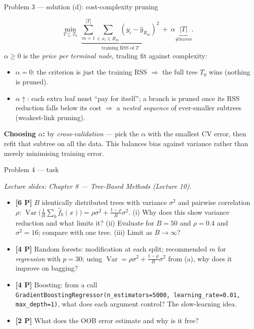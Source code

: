 \documentclass[aspectratio=169,11pt]{beamer}
\begin{document}
\begin{frame}{Problem 3 --- solution (d): cost-complexity pruning}
  \begin{solutionbox}
    \[
      \min_{T\subseteq T_0}\ \underbrace{\sum_{m=1}^{|T|}\sum_{i:\,x_i\in R_m}(y_i-\hat y_{R_m})^2}_{\text{training RSS of }T}
      \ +\ \alpha\underbrace{|T|}_{\#\text{leaves}}.
    \]
    $\alpha\ge0$ is the \emph{price per terminal node}, trading fit against complexity:
    \begin{itemize}
      \item $\alpha=0$: the criterion is just the training RSS $\Rightarrow$ the full tree $T_0$
        wins (nothing is pruned).
      \item $\alpha\uparrow$: each extra leaf must ``pay for itself''; a branch is pruned once its
        RSS reduction falls below its cost $\Rightarrow$ a \emph{nested sequence} of ever-smaller
        subtrees (weakest-link pruning).
    \end{itemize}
    \textbf{Choosing $\alpha$:} by \emph{cross-validation} --- pick the $\alpha$ with the smallest
    CV error, then refit that subtree on all the data. This balances bias against variance rather
    than merely minimising training error.
  \end{solutionbox}
\end{frame}

\begin{frame}{Problem 4 --- task}
  \begin{exercise}
    {\scriptsize\itshape Lecture slides: Chapter 8 --- Tree-Based Methods (Lecture 10).}\par\smallskip
    \begin{itemize}
      \item[(a)] \textbf{[6 P]} $B$ identically distributed trees with variance $\sigma^2$ and
        pairwise correlation $\rho$:
        $\operatorname{Var}\bigl(\frac1B\sum_b\hat f_b(x)\bigr)=\rho\sigma^2+\frac{1-\rho}{B}\sigma^2$.
        (i) Why does this show variance reduction and what limits it?
        (ii) Evaluate for $B=50$ and $\rho=0.4$ and $\sigma^2=16$; compare with one tree.
        (iii) Limit as $B\to\infty$?
      \item[(b)] \textbf{[4 P]} Random forests: modification at each split; recommended $m$ for
        \emph{regression} with $p=30$; using
        $\operatorname{Var}=\rho\sigma^2+\tfrac{1-\rho}{B}\sigma^2$ from (a), why does it improve
        on bagging?
      \item[(c)] \textbf{[4 P]} Boosting: from a call
        \texttt{GradientBoostingRegressor(n\_estimators=5000, learning\_rate=0.01, max\_depth=1)},
        what does each argument control? The slow-learning idea.
      \item[(d)] \textbf{[2 P]} What does the OOB error estimate and why is it free?
    \end{itemize}
  \end{exercise}
\end{frame}
\end{document}
